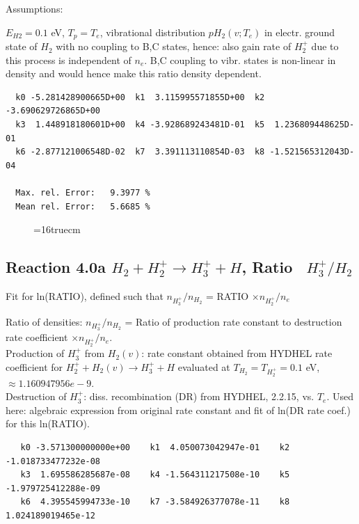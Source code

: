 \documentclass[12pt,dvipdfmx]{article}
\begin{document}
Assumptions:

$E_{H2} = 0.1$ eV, $T_p = T_e$, vibrational distribution $pH_2(v;T_e)$ in electr. ground state of $H_2$ with
no coupling to B,C states,
hence: also gain rate of $H_2^+$ due to this process is independent of $n_e$.
B,C coupling to vibr. states is non-linear in density and would hence make this ratio density dependent.

\begin{small}\begin{verbatim}
  k0 -5.281428900665D+00  k1  3.115995571855D+00  k2 -3.690629726865D+00
  k3  1.448918180601D+00  k4 -3.928689243481D-01  k5  1.236809448625D-01
  k6 -2.877121006548D-02  k7  3.391113110854D-03  k8 -1.521565312043D-04

  Max. rel. Error:   9.3977 %
  Mean rel. Error:   5.6685 %
\end{verbatim}\end{small}


\begin{figure} \label{2.0a}
\epsfxsize=16truecm
\end{figure}

\newpage
\subsection{
Reaction 4.0a   $ H_2 + H_2^+ \rightarrow H_3^+ + H$, Ratio \ $H_3^+/H_2$
}

Fit for ln(RATIO), defined such that $n_{H_3^+}/n_{H_2}$ = RATIO $\times n_{H_2^+}/n_e$

 Ratio of densities: $n_{H_3^+}/n_{H_2}$ = Ratio of production rate constant
 to destruction rate coefficient $\times n_{H_2^+}/n_e$. \\
  Production of $H_3^+$ from $H_2(v)$:  rate constant obtained from HYDHEL rate coefficient
  for $ H_2^+ + H_2(v) \rightarrow H_3^+ + H$
  evaluated at $T_{H_2} = T_{H_2^+} = 0.1$ eV,  $ \approx 1.160947956 e-9$. \\
  Destruction of $H_3^+$: diss. recombination (DR) from HYDHEL, 2.2.15, vs. $T_e$.
  Used here: algebraic expression from original rate constant and fit of ln(DR rate coef.)
  for this ln(RATIO).

\begin{small}\begin{verbatim}
   k0 -3.571300000000e+00    k1  4.050073042947e-01    k2 -1.018733477232e-08
   k3  1.695586285687e-08    k4 -1.564311217508e-10    k5 -1.979725412288e-09
   k6  4.395545994733e-10    k7 -3.584926377078e-11    k8  1.024189019465e-12
\end{verbatim}\end{small}
\newpage
\end{document}
